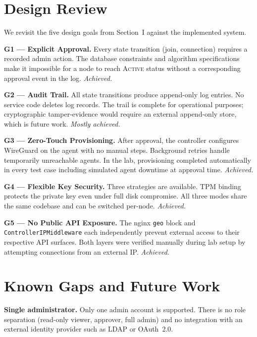 \documentclass[conference]{IEEEtran}
\begin{document}
\section{Design Review}
\label{sec:evaluation}

We revisit the five design goals from Section~I against the implemented system.

\textbf{G1 — Explicit Approval.} Every state transition (join, connection)
requires a recorded admin action. The database constraints and algorithm
specifications make it impossible for a node to reach \textsc{Active} status
without a corresponding approval event in the log. \textit{Achieved.}

\textbf{G2 — Audit Trail.} All state transitions produce append-only log
entries. No service code deletes log records. The trail is complete for
operational purposes; cryptographic tamper-evidence would require an
external append-only store, which is future work. \textit{Mostly achieved.}

\textbf{G3 — Zero-Touch Provisioning.} After approval, the controller
configures WireGuard on the agent with no manual steps. Background retries
handle temporarily unreachable agents. In the lab, provisioning completed
automatically in every test case including simulated agent downtime at
approval time. \textit{Achieved.}

\textbf{G4 — Flexible Key Security.} Three strategies are available. TPM
binding protects the private key even under full disk compromise. All three
modes share the same codebase and can be switched per-node. \textit{Achieved.}

\textbf{G5 — No Public API Exposure.} The nginx \texttt{geo} block and
\texttt{ControllerIPMiddleware} each independently prevent external access
to their respective API surfaces. Both layers were verified manually during
lab setup by attempting connections from an external IP. \textit{Achieved.}


\section{Known Gaps and Future Work}
\label{sec:limitations}

\textbf{Single administrator.} Only one admin account is supported. There is
no role separation (read-only viewer, approver, full admin) and no integration
with an external identity provider such as LDAP or OAuth~2.0.
\end{document}
